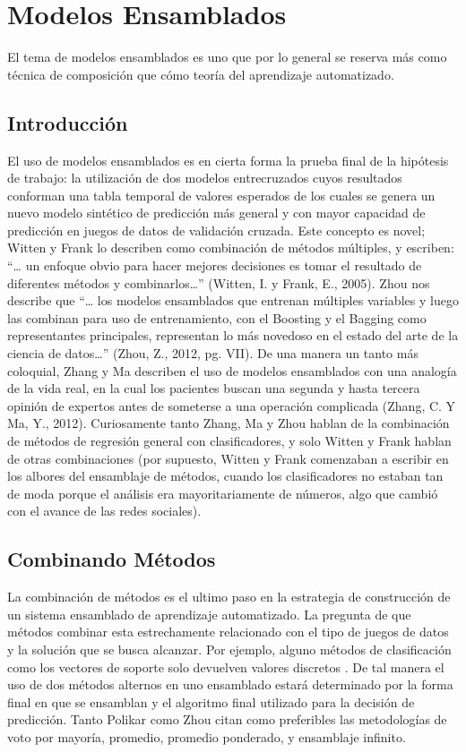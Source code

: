 \documentclass[letterpaper, spanish, 11pt]{report}
\begin{document}
\section{Modelos Ensamblados}
El tema de modelos ensamblados es uno que por lo general se reserva más como técnica de composición que cómo teoría del aprendizaje automatizado. 

\subsection{Introducción}
El uso de modelos ensamblados es en cierta forma la prueba final de la hipótesis de trabajo: la utilización de dos modelos entrecruzados cuyos resultados conforman una tabla temporal de valores esperados de los cuales se genera un nuevo modelo sintético de predicción más general y con mayor capacidad de predicción en juegos de datos de validación cruzada. Este concepto es novel; Witten y Frank lo describen como combinación de métodos múltiples, y escriben: “… un enfoque obvio para hacer mejores decisiones es tomar el resultado de diferentes métodos y combinarlos…” (Witten, I. y Frank, E., 2005). Zhou nos describe que “… los modelos ensamblados que entrenan múltiples variables y luego las combinan para uso de entrenamiento, con el Boosting y el Bagging como representantes principales, representan lo más novedoso en el estado del arte de la ciencia de datos…” (Zhou, Z., 2012, pg. VII). De una manera un tanto más coloquial, Zhang y Ma describen el uso de modelos ensamblados con una analogía de la vida real, en la cual los pacientes buscan una segunda y hasta tercera opinión de expertos antes de someterse a una operación complicada (Zhang, C. Y Ma, Y., 2012). Curiosamente tanto Zhang, Ma y Zhou hablan de la combinación de métodos de regresión general con clasificadores, y solo Witten y Frank hablan de otras combinaciones (por supuesto, Witten y Frank comenzaban a escribir en los albores del ensamblaje de métodos, cuando los clasificadores no estaban tan de moda porque el análisis era mayoritariamente de números, algo que cambió con el avance de las redes sociales). 

\subsection{Combinando Métodos}
La combinación de métodos es el ultimo paso en la estrategia de construcción de un sistema ensamblado de aprendizaje automatizado. La pregunta de que métodos combinar esta estrechamente relacionado con el tipo de juegos de datos y la solución que se busca alcanzar. Por ejemplo, alguno métodos de clasificación como los vectores de soporte solo devuelven valores discretos \cite{ensembleMachineLearning}. De tal manera el uso de dos métodos alternos en uno ensamblado estará determinado por la forma final en que se ensamblan y el algoritmo final utilizado para la decisión de predicción. Tanto Polikar \cite{ensembleMachineLearning} como Zhou \cite{ensembleMethods} citan como preferibles las metodologías de voto por mayoría, promedio, promedio ponderado, y ensamblaje infinito. 
\end{document}
